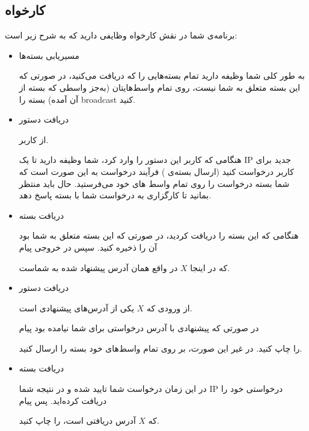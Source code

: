 
\subsection{کارخواه}
برنامه‌ی شما در نقش کارخواه وظایفی دارید که به شرح زیر است:
\begin{itemize}
\item
مسیریابی بسته‌ها

به طور کلی شما وظیفه دارید تمام بسته‌هایی را که دریافت می‌کنید، در صورتی که این بسته متعلق به شما نیست، روی تمام واسط‌هایتان (به‌جز واسطی که بسته از آن آمده) بسته را broadcast کنید.

\item
دریافت دستور 
\begin{flushleft}
\end{flushleft}
از کاربر.

هنگامی که کاربر این دستور را وارد کرد، شما وظیفه دارید تا یک IP جدید برای کاربر درخواست کنید (ارسال بسته‌ی 
)
فرآیند درخواست به این صورت است که شما بسته درخواست را روی تمام واسط های خود می‌فرستید. حال باید منتظر بمانید تا کارگزاری به درخواست شما با بسته
پاسخ دهد.

\item
دریافت بسته

هنگامی که این بسته را دریافت کردید، در صورتی که این بسته متعلق به شما بود آن را ذخیره کنید. سپس در خروجی پیام 
\begin{flushleft}
\end{flushleft}
که در اینجا $X$ در واقع همان آدرس پیشنهاد شده به شماست.

\item
دریافت دستور 
\begin{flushleft}
\end{flushleft}
از ورودی که $X$ یکی از آدرس‌های پیشنهادی است.

در صورتی که پیشنهادی با آدرس درخواستی برای شما نیامده بود پیام
\begin{flushleft}
\end{flushleft}
را چاپ کنید. در غیر این صورت، بر روی تمام واسط‌های خود بسته 
را ارسال کنید.

\item
دریافت بسته

در این زمان درخواست شما تایید شده و در نتیجه شما IP درخواستی خود را دریافت کرده‌اید. پس پیام 
\begin{flushleft}
\end{flushleft}
که $X$ آدرس دریافتی است، را چاپ کنید.


\end{itemize}
